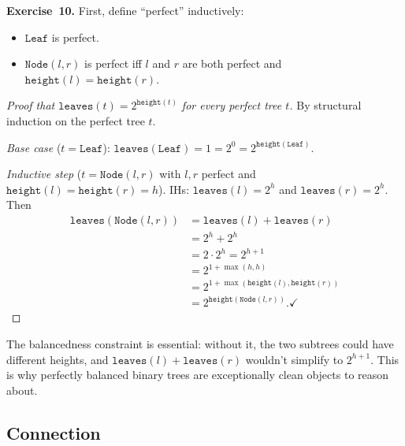 \documentclass[11pt]{article}
\begin{document}
\medskip
\textbf{Exercise~10.}
First, define ``perfect'' inductively:
\begin{itemize}
  \item $\texttt{Leaf}$ is perfect.
  \item $\texttt{Node}(l, r)$ is perfect iff $l$ and $r$ are both perfect and $\texttt{height}(l) = \texttt{height}(r)$.
\end{itemize}

\begin{proof}[Proof that $\texttt{leaves}(t) = 2^{\texttt{height}(t)}$ for every perfect tree $t$]
By structural induction on the perfect tree $t$.

\emph{Base case} ($t = \texttt{Leaf}$): $\texttt{leaves}(\texttt{Leaf}) = 1 = 2^0 = 2^{\texttt{height}(\texttt{Leaf})}$. \checkmark

\emph{Inductive step} ($t = \texttt{Node}(l, r)$ with $l, r$ perfect and $\texttt{height}(l) = \texttt{height}(r) = h$). IHs: $\texttt{leaves}(l) = 2^h$ and $\texttt{leaves}(r) = 2^h$. Then
\begin{align*}
  \texttt{leaves}(\texttt{Node}(l, r)) &= \texttt{leaves}(l) + \texttt{leaves}(r) \\
                                        &= 2^h + 2^h \\
                                        &= 2 \cdot 2^h = 2^{h+1} \\
                                        &= 2^{1 + \max(h, h)} \\
                                        &= 2^{1 + \max(\texttt{height}(l), \texttt{height}(r))} \\
                                        &= 2^{\texttt{height}(\texttt{Node}(l, r))}. \checkmark
\end{align*}
\end{proof}

The balancedness constraint is essential: without it, the two subtrees could have different heights, and $\texttt{leaves}(l) + \texttt{leaves}(r)$ wouldn't simplify to $2^{h+1}$. This is why perfectly balanced binary trees are exceptionally clean objects to reason about.

\subsection*{Connection}
\end{document}
